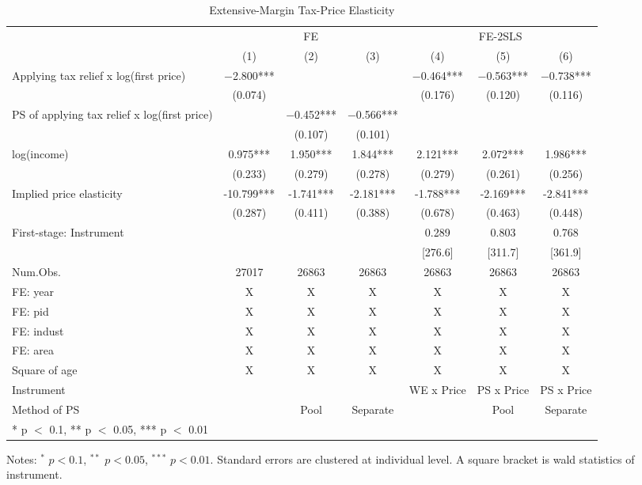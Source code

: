 \documentclass[
  11pt,
  a4paper,
]{article}
\begin{document}
\begin{table}

\caption{\label{tab:MainExtensive}Extensive-Margin Tax-Price Elasticity}
\centering
\fontsize{8}{10}\selectfont
\begin{threeparttable}
\begin{tabular}[t]{lcccccc}
\toprule
\multicolumn{1}{c}{ } & \multicolumn{3}{c}{FE} & \multicolumn{3}{c}{FE-2SLS} \\
\cmidrule(l{3pt}r{3pt}){2-4} \cmidrule(l{3pt}r{3pt}){5-7}
  & (1) & (2) & (3) & (4) & (5) & (6)\\
\midrule
Applying tax relief x log(first price) & \num{-2.800}*** &  &  & \num{-0.464}*** & \num{-0.563}*** & \num{-0.738}***\\
 & (\num{0.074}) &  &  & (\num{0.176}) & (\num{0.120}) & (\num{0.116})\\
PS of applying tax relief x log(first price) &  & \num{-0.452}*** & \num{-0.566}*** &  &  & \\
 &  & (\num{0.107}) & (\num{0.101}) &  &  & \\
log(income) & \num{0.975}*** & \num{1.950}*** & \num{1.844}*** & \num{2.121}*** & \num{2.072}*** & \num{1.986}***\\
 & (\num{0.233}) & (\num{0.279}) & (\num{0.278}) & (\num{0.279}) & (\num{0.261}) & (\num{0.256})\\
\midrule
Implied price elasticity & -10.799*** & -1.741*** & -2.181*** & -1.788*** & -2.169*** & -2.841***\\
 & (0.287) & (0.411) & (0.388) & (0.678) & (0.463) & (0.448)\\
First-stage: Instrument &  &  &  & 0.289 & 0.803 & 0.768\\
 &  &  &  & [276.6] & [311.7] & [361.9]\\
Num.Obs. & \num{27017} & \num{26863} & \num{26863} & \num{26863} & \num{26863} & \num{26863}\\
FE: year & X & X & X & X & X & X\\
FE: pid & X & X & X & X & X & X\\
FE: indust & X & X & X & X & X & X\\
FE: area & X & X & X & X & X & X\\
Square of age & X & X & X & X & X & X\\
Instrument &  &  &  & WE x Price & PS x Price & PS x Price\\
Method of PS &  & Pool & Separate &  & Pool & Separate\\
\bottomrule
\multicolumn{7}{l}{\rule{0pt}{1em}* p $<$ 0.1, ** p $<$ 0.05, *** p $<$ 0.01}\\
\end{tabular}
\begin{tablenotes}
\item Notes: $^{*}$ $p < 0.1$, $^{**}$ $p < 0.05$, $^{***}$ $p < 0.01$. Standard errors are clustered at individual level. A square bracket is wald statistics of instrument.
\end{tablenotes}
\end{threeparttable}
\end{table}
\end{document}
